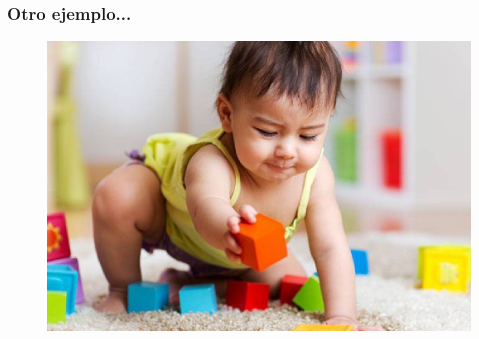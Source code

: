 \documentclass[10pt]{beamer}
\begin{document}
\begin{frame}
    \frametitle{Otro ejemplo...}
    \begin{figure}[!h] 
        \centering
        \includegraphics[width=1\textwidth]{img/bebe}
    \end{figure} 
\end{frame}
\end{document}
